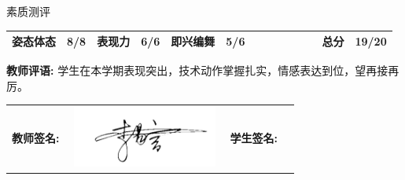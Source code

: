 \documentclass{article}
\begin{document}
\begin{CJK*}{UTF8}{gbsn}
\begin{center}
\begin{tabular}
\end{tabular}

\vspace{0.5cm}
素质测评
\vspace{0.3cm}

\begin{tabular}{|>{\normalsize}p{}>{\normalsize}p{}|>{\normalsize}p{}>{\normalsize}p{}|>{\normalsize}p{}>{\normalsize}p{}|>{\normalsize}p{}>{\normalsize}p{}|>{\normalsize}p{}>{\normalsize}p{}|>{\normalsize}p{}>{\normalsize}p{}|>{\normalsize}p{}>{\normalsize}p{}|}
    \hline
    \rule{0pt}{2.5ex}姿态体态 & 8/8 & 表现力 & 6/6 & 即兴编舞 & 5/6 &  &  &  &  &  &  & 总分 & \textbf{19/20}\\ \hline
    
\end{tabular}


\end{center}

\vspace{0.5cm}

\textbf{教师评语:} 学生在本学期表现突出，技术动作掌握扎实，情感表达到位，望再接再厉。

\vspace{0.5cm}


\begin{tabular}{llll}
    \textbf{教师签名:} & \includegraphics[width=5cm, height=2cm]{signature.png} & \textbf{学生签名:} & \underline{\hspace{5cm}} \\
  
    \end{tabular}

    
\end{CJK*}
\end{document}
